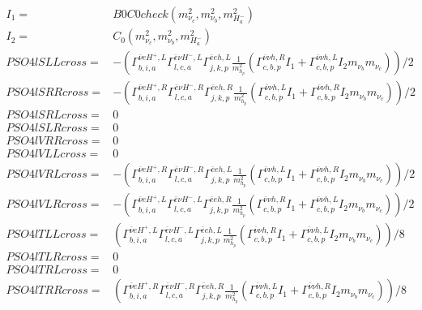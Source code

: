\documentclass[A4,landscape]{article}
\begin{document}
\begin{align} 
I_1= & B0C0check(m^2_{\nu_{{c}}}, m^2_{\nu_{{b}}}, m^2_{H^-_{{a}}}) \\ 
I_2= & C_0(m^2_{\nu_{{c}}}, m^2_{\nu_{{b}}}, m^2_{H^-_{{a}}}) \\ 
  PSO4lSLLcross= & -( \Gamma^{\bar{\nu}e H^+,L}_{b, i, a} \Gamma^{\bar{e}\nu H^- ,L}_{l, c, a} \Gamma^{\bar{e}e h ,L}_{j, k, p} \frac{1}{m^2_{h_{{p}}}} (\Gamma^{\bar{\nu}\nu h ,R}_{c, b, p} I_1 + \Gamma^{\bar{\nu}\nu h ,L}_{c, b, p} I_2 m_{\nu_{{b}}} m_{\nu_{{c}}}))/2 \\ 
  PSO4lSRRcross= & -( \Gamma^{\bar{\nu}e H^+,R}_{b, i, a} \Gamma^{\bar{e}\nu H^- ,R}_{l, c, a} \Gamma^{\bar{e}e h ,R}_{j, k, p} \frac{1}{m^2_{h_{{p}}}} (\Gamma^{\bar{\nu}\nu h ,L}_{c, b, p} I_1 + \Gamma^{\bar{\nu}\nu h ,R}_{c, b, p} I_2 m_{\nu_{{b}}} m_{\nu_{{c}}}))/2 \\ 
  PSO4lSRLcross= & 0 \\ 
  PSO4lSLRcross= & 0 \\ 
  PSO4lVRRcross= & 0 \\ 
  PSO4lVLLcross= & 0 \\ 
  PSO4lVRLcross= & -( \Gamma^{\bar{\nu}e H^+,R}_{b, i, a} \Gamma^{\bar{e}\nu H^- ,R}_{l, c, a} \Gamma^{\bar{e}e h ,L}_{j, k, p} \frac{1}{m^2_{h_{{p}}}} (\Gamma^{\bar{\nu}\nu h ,L}_{c, b, p} I_1 + \Gamma^{\bar{\nu}\nu h ,R}_{c, b, p} I_2 m_{\nu_{{b}}} m_{\nu_{{c}}}))/2 \\ 
  PSO4lVLRcross= & -( \Gamma^{\bar{\nu}e H^+,L}_{b, i, a} \Gamma^{\bar{e}\nu H^- ,L}_{l, c, a} \Gamma^{\bar{e}e h ,R}_{j, k, p} \frac{1}{m^2_{h_{{p}}}} (\Gamma^{\bar{\nu}\nu h ,R}_{c, b, p} I_1 + \Gamma^{\bar{\nu}\nu h ,L}_{c, b, p} I_2 m_{\nu_{{b}}} m_{\nu_{{c}}}))/2 \\ 
  PSO4lTLLcross= & ( \Gamma^{\bar{\nu}e H^+,L}_{b, i, a} \Gamma^{\bar{e}\nu H^- ,L}_{l, c, a} \Gamma^{\bar{e}e h ,L}_{j, k, p} \frac{1}{m^2_{h_{{p}}}} (\Gamma^{\bar{\nu}\nu h ,R}_{c, b, p} I_1 + \Gamma^{\bar{\nu}\nu h ,L}_{c, b, p} I_2 m_{\nu_{{b}}} m_{\nu_{{c}}}))/8 \\ 
  PSO4lTLRcross= & 0 \\ 
  PSO4lTRLcross= & 0 \\ 
  PSO4lTRRcross= & ( \Gamma^{\bar{\nu}e H^+,R}_{b, i, a} \Gamma^{\bar{e}\nu H^- ,R}_{l, c, a} \Gamma^{\bar{e}e h ,R}_{j, k, p} \frac{1}{m^2_{h_{{p}}}} (\Gamma^{\bar{\nu}\nu h ,L}_{c, b, p} I_1 + \Gamma^{\bar{\nu}\nu h ,R}_{c, b, p} I_2 m_{\nu_{{b}}} m_{\nu_{{c}}}))/8 \\ 
\end{align} 
\end{document}

